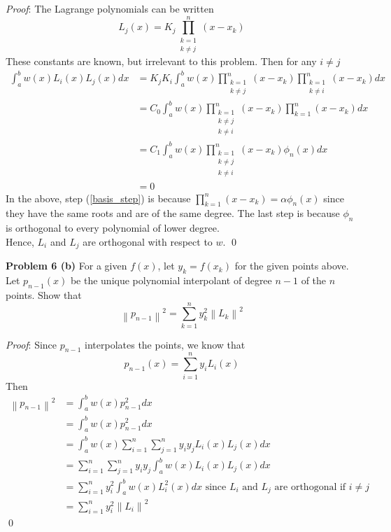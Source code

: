 \documentclass[12pt]{article}
\newcommand{\problem}[1]{\hspace{-4 ex} \large \textbf{Problem #1} }
\newcommand{\norm}[1]{\left\lVert#1\right\rVert}
\renewenvironment{proof}{\hspace{-4 ex} \emph{Proof}:}{\qed}
\begin{document}
	\begin{proof}
		The Lagrange polynomials can be written
		$$
		L_j(x) = K_j \prod_{\substack{k=1 \\ k \neq j}}^n(x-x_k)
		$$
		These constants are known, but irrelevant to this problem. Then for any $i \neq j$
		\begin{align}
			\int_a^b w(x)L_i(x)L_j(x) dx & = K_jK_i \int_a^b w(x) \prod_{\substack{k=1 \\ k \neq j}}^n(x-x_k) \prod_{\substack{k=1 \\ k \neq i }}^n(x-x_k)  dx \nonumber \\
			& = C_0 \int_a^b w(x) \prod_{\substack{k=1 \\ k \neq j \\ k \neq i}}^n(x-x_k)  \prod_{k=1}^n(x-x_k) dx  \nonumber \\
			& = C_1 \int_a^b w(x) \prod_{\substack{k=1 \\ k \neq j \\ k \neq i}}^n(x-x_k)  \phi_n(x) dx \label{basis_step}\\
			& = 0
		\end{align}
		In the above, step (\ref{basis_step}) is because $\prod\limits_{k=1}^n (x-x_k) = \alpha \phi_n(x)$ since they have the same roots and are of the same degree. The last step is because $\phi_n$ is orthogonal to every polynomial of lower degree.\\
		Hence, $L_i$ and $L_j$ are orthogonal with respect to $w$. 
	\end{proof}
	
\bigbreak
\problem{6 (b)} For a given $f(x)$, let $y_k = f(x_k)$ for the given points above. Let $p_{n-1}(x)$ be the unique polynomial interpolant of degree $n-1$ of the $n$ points. Show that 
$$
\norm{p_{n-1}}^2 = \sum_{k=1}^n y_k^2 \norm{L_k}^2
$$

	\begin{proof}
		Since $p_{n-1}$ interpolates the points, we know that 
		$$
		p_{n-1}(x) = \sum_{i=1}^n y_i L_i(x)
		$$
		Then
		\begin{align*}
			\norm{p_{n-1}}^2 & = \int_a^b w(x)p_{n-1}^2 dx \\
			& = \int_a^b w(x)p_{n-1}^2 dx \\
			& = \int_a^b w(x) \sum_{i=1}^n \sum_{j=1}^n y_iy_j L_i(x)L_j(x) dx \\
			& = \sum_{i=1}^n \sum_{j=1}^n y_iy_j \int_a^b w(x)   L_i(x)L_j(x) dx \\
			& = \sum_{i=1}^n y_i^2 \int_a^b w(x)   L_i^2(x) dx \text{\ \ \ since $L_i$ and $L_j$ are orthogonal if $i \neq j$}\\
			& = \sum_{i=1}^n y_i^2 \norm{L_i}^2
		\end{align*}
	\end{proof}

		
\end{document}
